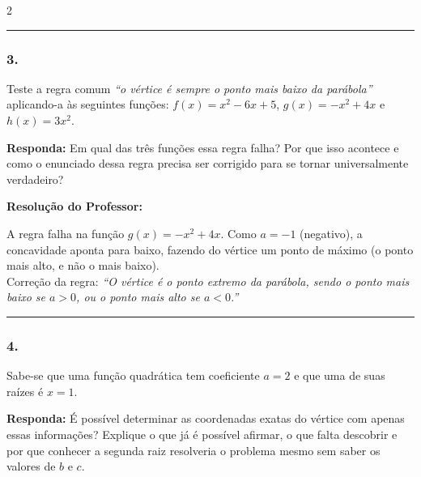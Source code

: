 \begin{multicols*}{2}
\par\vspace{\espacoQuestao}

\noindent\textcolor{CorLinha}{\rule{\linewidth}{0.5pt}} 
\par\vspace{\espacoPreQuestao}
\subsubsection*{3.} Teste a regra comum \textit{``o vértice é sempre o ponto mais baixo da parábola''} aplicando-a às seguintes funções: $f(x) = x^2 - 6x + 5$, $g(x) = -x^2 + 4x$ e $h(x) = 3x^2$.

\begin{boxresponda}
\textbf{Responda:} Em qual das três funções essa regra falha? Por que isso acontece e como o enunciado dessa regra precisa ser corrigido para se tornar universalmente verdadeiro?
\end{boxresponda}

\ifgabarito
    \begin{tcolorbox}[colback=CorTitUm!5, colframe=CorTitUm, boxrule=1pt, arc=4pt, left=6pt, right=6pt, top=6pt, bottom=6pt]
    \small\textbf{\textcolor{CorTitUm}{Resolução do Professor:}}\par\vspace{0.1cm}
    \color{CinzaEscuro}
    A regra falha na função $g(x) = -x^2 + 4x$. Como $a = -1$ (negativo), a concavidade aponta para baixo, fazendo do vértice um ponto de máximo (o ponto mais alto, e não o mais baixo). \\
    Correção da regra: \textit{``O vértice é o ponto extremo da parábola, sendo o ponto mais baixo se $a > 0$, ou o ponto mais alto se $a < 0$.''}
    \end{tcolorbox}
\fi

\par\vspace{\espacoQuestao}

\noindent\textcolor{CorLinha}{\rule{\linewidth}{0.5pt}} 
\par\vspace{\espacoPreQuestao}
\subsubsection*{4.} Sabe-se que uma função quadrática tem coeficiente $a = 2$ e que uma de suas raízes é $x = 1$. 

\begin{boxresponda}
\textbf{Responda:} É possível determinar as coordenadas exatas do vértice com apenas essas informações? Explique o que já é possível afirmar, o que falta descobrir e por que conhecer a segunda raiz resolveria o problema mesmo sem saber os valores de $b$ e $c$.
\end{boxresponda}


\end{multicols*}
